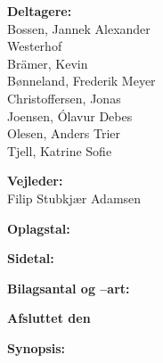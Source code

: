 \begin{titlepage}
\begin{minipage}{0.4\textwidth}
\begin{description}
    \item {\bf Deltagere:}\\
    Bossen, Jannek Alexander \\Westerhof\\
    Brämer, Kevin\\
    Bønneland, Frederik Meyer\\
    Christoffersen, Jonas\\
    Joensen, Ólavur Debes\\
    Olesen, Anders Trier\\
    Tjell, Katrine Sofie\\
    
    \item {\bf Vejleder:}\\
    Filip Stubkjær Adamsen\\
    
    \item {\bf Oplagstal:} \rprints
    \item {\bf Sidetal:} \pageref{LastPage} %
    \item {\bf Bilagsantal og --art:} \rappendices
    \item {\bf Afsluttet den} \rdeadline
    \end{description}
  \end{minipage}
  \hfill
  \begin{minipage}{0.4\textwidth}
    {\bf Synopsis:}\bigskip \\
    {\bigskip
    {\vfill{\small 
    \bigskip}}}
  \end{minipage}
\end{titlepage}
